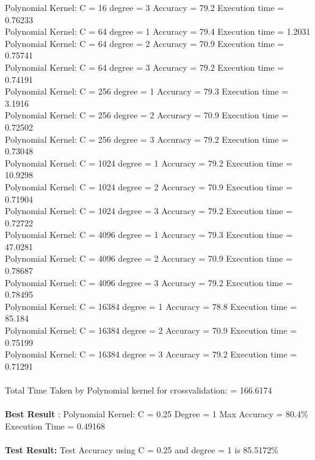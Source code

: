 \documentclass[paper=a4, fontsize=11pt]{scrartcl} %
\numberwithin{equation}{section} %
\numberwithin{figure}{section} %
\numberwithin{table}{section} %
\begin{document}
Polynomial Kernel: C = 16 degree = 3 Accuracy = 79.2 Execution time = 0.76233\\
Polynomial Kernel: C = 64 degree = 1 Accuracy = 79.4 Execution time = 1.2031\\
Polynomial Kernel: C = 64 degree = 2 Accuracy = 70.9 Execution time = 0.75741\\
Polynomial Kernel: C = 64 degree = 3 Accuracy = 79.2 Execution time = 0.74191\\
Polynomial Kernel: C = 256 degree = 1 Accuracy = 79.3 Execution time = 3.1916\\
Polynomial Kernel: C = 256 degree = 2 Accuracy = 70.9 Execution time = 0.72502\\
Polynomial Kernel: C = 256 degree = 3 Accuracy = 79.2 Execution time = 0.73048\\
Polynomial Kernel: C = 1024 degree = 1 Accuracy = 79.2 Execution time = 10.9298\\
Polynomial Kernel: C = 1024 degree = 2 Accuracy = 70.9 Execution time = 0.71904\\
Polynomial Kernel: C = 1024 degree = 3 Accuracy = 79.2 Execution time = 0.72722\\
Polynomial Kernel: C = 4096 degree = 1 Accuracy = 79.3 Execution time = 47.0281\\
Polynomial Kernel: C = 4096 degree = 2 Accuracy = 70.9 Execution time = 0.78687\\
Polynomial Kernel: C = 4096 degree = 3 Accuracy = 79.2 Execution time = 0.78495\\
Polynomial Kernel: C = 16384 degree = 1 Accuracy = 78.8 Execution time = 85.184\\
Polynomial Kernel: C = 16384 degree = 2 Accuracy = 70.9 Execution time = 0.75199\\
Polynomial Kernel: C = 16384 degree = 3 Accuracy = 79.2 Execution time = 0.71291\\\\

Total Time Taken by Polynomial kernel for crossvalidation: = 166.6174\\\\

\textbf{Best Result} : Polynomial Kernel: C = 0.25 Degree = 1 Max Accuracy = 80.4\% Execution Time = 0.49168 \\\\

\textbf{Test Result:} Test Accuracy using C = 0.25 and degree = 1 is 85.5172\%\\\\\\
\end{document}
